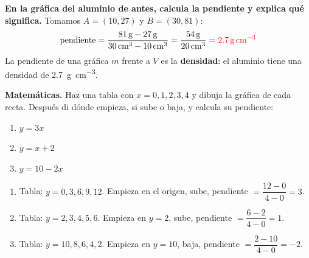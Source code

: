 \begin{example}
    \textbf{En la gráfica del aluminio de antes, calcula la pendiente y explica qué significa.} Tomamos \(A = (10, 27)\) y \(B = (30, 81)\):
    \begin{equation*}
        \text{pendiente} = \dfrac{\qty{81}{\g} - \qty{27}{\g}}{\qty{30}{\cubic\cm} - \qty{10}{\cubic\cm}} = \dfrac{\qty{54}{\g}}{\qty{20}{\cubic\cm}} = \textcolor{red}{\qty{2.7}{\g\per\cubic\cm}}
    \end{equation*}
    La pendiente de una gráfica \(m\) frente a \(V\) es la \textbf{densidad}: el aluminio tiene una densidad de \qty{2.7}{\g\per\cubic\cm}.
\end{example}

\begin{exercise}
    \textbf{Matemáticas.} Haz una tabla con \(x = 0, 1, 2, 3, 4\) y dibuja la gráfica de cada recta. Después di dónde empieza, si sube o baja, y calcula su pendiente:
    \begin{enumerate}[label=\letraminuscula]
        \item \(y = 3x\)
        \item \(y = x + 2\)
        \item \(y = 10 - 2x\)
    \end{enumerate}
    \begin{solu}
        \begin{enumerate}[label=\alph*)]
            \item Tabla: \(y = 0, 3, 6, 9, 12\). Empieza en el origen, sube, pendiente \(= \dfrac{12 - 0}{4 - 0} = 3\).
            \item Tabla: \(y = 2, 3, 4, 5, 6\). Empieza en \(y = 2\), sube, pendiente \(= \dfrac{6 - 2}{4 - 0} = 1\).
            \item Tabla: \(y = 10, 8, 6, 4, 2\). Empieza en \(y = 10\), baja, pendiente \(= \dfrac{2 - 10}{4 - 0} = -2\).
        \end{enumerate}
    \end{solu}
\end{exercise}

